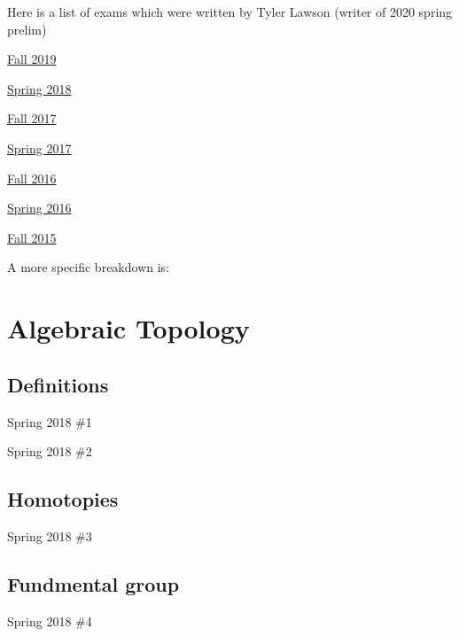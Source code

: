 \documentclass{amsart}
\begin{document}
\noindent Here is a list of exams which were written by Tyler Lawson (writer of 2020 spring prelim)

\begin{todolist}
	\item \href{https://math.umn.edu/sites/math.umn.edu/files/exams/mantopf19.pdf}{Fall 2019}
	\item \href{https://math.umn.edu/sites/math.umn.edu/files/exams/mantops18.pdf}{Spring 2018}
	\item \href{https://math.umn.edu/sites/math.umn.edu/files/exams/mantopf17.pdf}{Fall 2017}
	\item \href{https://math.umn.edu/sites/math.umn.edu/files/exams/mantops17.pdf}{Spring 2017}
	\item \href{https://math.umn.edu/sites/math.umn.edu/files/exams/mantopf16.pdf}{Fall 2016}
	\item \href{https://math.umn.edu/sites/math.umn.edu/files/exams/mantops16.pdf}{Spring 2016}
	\item \href{https://math.umn.edu/sites/math.umn.edu/files/exams/mantopf15.pdf}{Fall 2015}
\end{todolist}

\noindent A more specific breakdown is:

\section{Algebraic Topology}

\subsection{Definitions}
\begin{todolist}
	\item Spring 2018 \#1
	\item Spring 2018 \#2
	\item
\end{todolist}


\subsection{Homotopies}
\begin{todolist}
	\item Spring 2018 \#3
\end{todolist}

\subsection{Fundmental group}
\begin{todolist}
	\item Spring 2018 \#4
\end{todolist}
\end{document}
